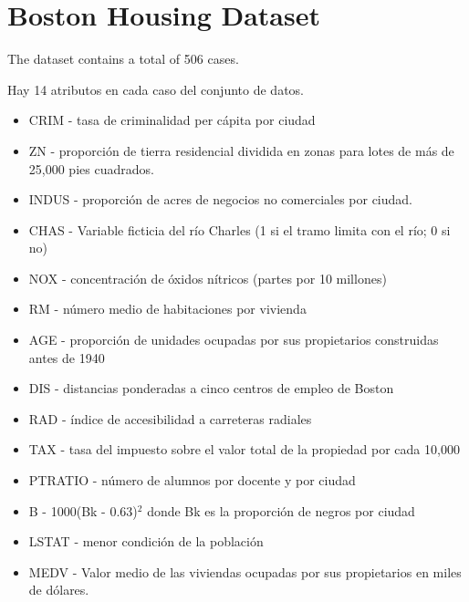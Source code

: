 \section{Boston Housing Dataset}
The dataset contains a total of 506 cases.\par
\indent Hay 14 atributos en cada caso del conjunto de datos.
\begin{itemize}
    \item CRIM - tasa de criminalidad per cápita por ciudad
    \item ZN - proporción de tierra residencial dividida en zonas para lotes de más de 25,000 pies cuadrados.
    \item INDUS - proporción de acres de negocios no comerciales por ciudad.
    \item CHAS - Variable ficticia del río Charles (1 si el tramo limita con el río; 0 si no)
    \item NOX - concentración de óxidos nítricos (partes por 10 millones)
    \item RM - número medio de habitaciones por vivienda
    \item AGE - proporción de unidades ocupadas por sus propietarios construidas antes de 1940
    \item DIS - distancias ponderadas a cinco centros de empleo de Boston
    \item RAD - índice de accesibilidad a carreteras radiales
    \item TAX - tasa del impuesto sobre el valor total de la propiedad por cada 10,000
    \item PTRATIO - número de alumnos por docente y por ciudad
    \item B - 1000(Bk - 0.63)$^{2}$ donde Bk es la proporción de negros por ciudad
    \item LSTAT - menor condición de la población
    \item MEDV - Valor medio de las viviendas ocupadas por sus propietarios en miles de dólares.
\end{itemize}
